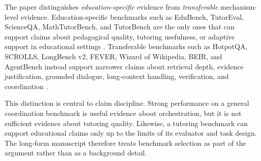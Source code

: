 The paper distinguishes \emph{education-specific} evidence from \emph{transferable} mechanism-level evidence. Education-specific benchmarks such as EduBench, TutorEval, ScienceQA, MathTutorBench, and TutorBench are the only ones that can support claims about pedagogical quality, tutoring usefulness, or adaptive support in educational settings \cite{xu2025edubench,chevalier2024sciencetutors,lu2022scienceqa,macina2025mathtutorbench,srinivasa2025tutorbench}. Transferable benchmarks such as HotpotQA, SCROLLS, LongBench v2, FEVER, Wizard of Wikipedia, BEIR, and AgentBench instead support narrower claims about retrieval depth, evidence justification, grounded dialogue, long-context handling, verification, and coordination \cite{yang2018hotpotqa,shaham2022scrolls,bai2024longbench2,thorne2018fever,dinan2019wizard,thakur2021beir,liu2023agentbench}.

This distinction is central to claim discipline. Strong performance on a general coordination benchmark is useful evidence about orchestration, but it is not sufficient evidence about tutoring quality. Likewise, a tutoring benchmark can support educational claims only up to the limits of its evaluator and task design. The long-form manuscript therefore treats benchmark selection as part of the argument rather than as a background detail.
